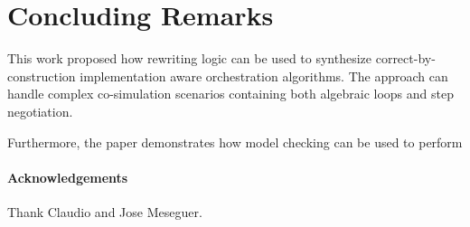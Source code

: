 \section{Concluding Remarks}\label{sc:summary}
This work proposed how rewriting logic can be used to synthesize correct-by-construction implementation aware orchestration algorithms.
The approach can handle complex co-simulation scenarios containing both algebraic loops and step negotiation.

Furthermore, the paper demonstrates how model checking can be used to perform 


\paragraph{Acknowledgements}
Thank Claudio and Jose Meseguer.